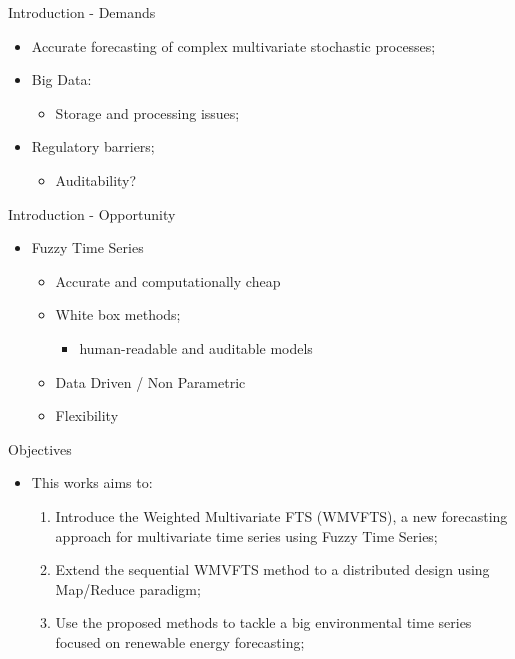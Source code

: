 \documentclass{beamer}
\begin{document}
\begin{frame}{Introduction - Demands}
\linespread{1.5}
\begin{itemize}
\item Accurate forecasting of complex multivariate stochastic processes;
\item Big Data:
\begin{itemize}
    \item Storage and processing issues;
\end{itemize}
\item Regulatory barriers;
\begin{itemize}
    \item Auditability? 
\end{itemize}
\end{itemize}
\end{frame}


\begin{frame}{Introduction - Opportunity}
\linespread{2}
\begin{itemize}
\item Fuzzy Time Series
\begin{itemize}
\item Accurate and computationally cheap
\item White box methods;
\begin{itemize}
    \item human-readable and auditable models
\end{itemize}
\item Data Driven / Non Parametric
\item Flexibility
\end{itemize}
\end{itemize}
\end{frame}




\begin{frame}{Objectives}
\linespread{2}
\begin{itemize}
\item This works aims to:
\begin{enumerate}
\item Introduce the Weighted Multivariate FTS (WMVFTS), a new forecasting approach for multivariate time series using Fuzzy Time Series;
\item Extend the sequential WMVFTS method to a distributed design using Map/Reduce paradigm;
\item Use the proposed methods to tackle a big environmental time series focused on renewable energy forecasting;
\end{enumerate}
\end{itemize}
\end{frame}
\end{document}
